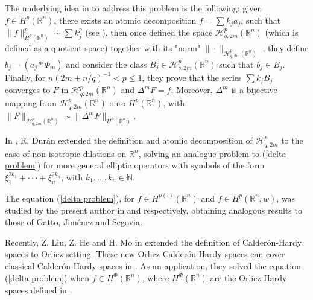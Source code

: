 \documentclass[reqno,10pt]{article}
\theoremstyle{definition}
\numberwithin{equation}{section}
\numberwithin{theorem}{section}
\begin{document}
The underlying idea in \cite{segovia} to address this problem is the following: given $f \in H^p(\mathbb{R}^n)$, there exists an atomic decomposition $f = \sum k_j a_j$, such that $\|f\|_{H^p(\mathbb{R}^n)}^p \sim \sum k_j^p$ (see \cite{Latter}), then once defined the space 
$\mathcal{H}^p_{q, 2m}(\mathbb{R}^n)$ (which is defined as a quotient space) together with its "norm" 
$\| \cdot \|_{\mathcal{H}^p_{q, 2m}(\mathbb{R}^n)}$ , they define $b_j = (a_j \ast \Phi_m)$ and consider the class 
$B_j \in \mathcal{H}^p_{q, 2m}(\mathbb{R}^n)$ such that $b_j \in B_j$. Finally, for $n(2m+n/q)^{-1} < p \leq 1$, they prove that the series 
$\sum k_j B_j$ converges to $F$ in $\mathcal{H}^p_{q, 2m}(\mathbb{R}^n)$ and $\Delta^m F = f$. Moreover, $\Delta^m$ is a bijective mapping from $\mathcal{H}^p_{q, 2m}(\mathbb{R}^n)$ onto $H^p(\mathbb{R}^n)$, with 
$\| F \|_{\mathcal{H}^p_{q, 2m}(\mathbb{R}^n)} \sim \|\Delta^m F \|_{H^p(\mathbb{R}^n)}$.

In \cite{Duran}, R. Dur\'an extended the definition and atomic decomposition of $\mathcal{H}^p_{q, 2m}$ to the case of 
non-isotropic dilations on $\mathbb{R}^n$, solving an analogue problem to (\ref{delta problem}) for more general elliptic operators with symbols of the form $\xi_1^{2k_1} + \cdot \cdot \cdot + \xi_n^{2k_n}$, with $k_1, ..., k_n \in \mathbb{N}$.

The equation (\ref{delta problem}), for $f \in H^{p(\cdot)}(\mathbb{R}^{n})$ and $f \in H^{p}(\mathbb{R}^{n}, w)$, was studied by the present author in \cite{rocha1} and \cite{rocha2} respectively, obtaining analogous results to those of Gatto, Jim\'enez and Segovia.

Recently, Z. Liu, Z. He and H. Mo in \cite{He} extended the definition of Calder\'on-Hardy spaces to Orlicz setting. These new Orlicz 
Calder\'on-Hardy spaces can cover classical Calder\'on-Hardy spaces in \cite{segovia}. As an application, they solved the equation 
(\ref{delta problem}) when $f \in H^{\Phi}(\mathbb{R}^{n})$, where $H^{\Phi}(\mathbb{R}^{n})$ are the Orlicz-Hardy spaces defined 
in \cite{Nakai}.
\end{document}
